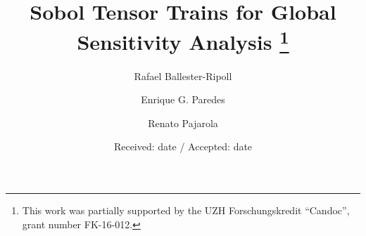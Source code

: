 \documentclass[review, twocolumn]{svjour3}          %
\begin{document}
\title{Sobol Tensor Trains for Global Sensitivity Analysis
\thanks{This work was partially supported by the UZH Forschungskredit ``Candoc'', grant number FK-16-012.}
}

\author{Rafael Ballester-Ripoll \and
Enrique G. Paredes \and
Renato Pajarola}



\date{Received: date / Accepted: date}

\maketitle
\end{document}
